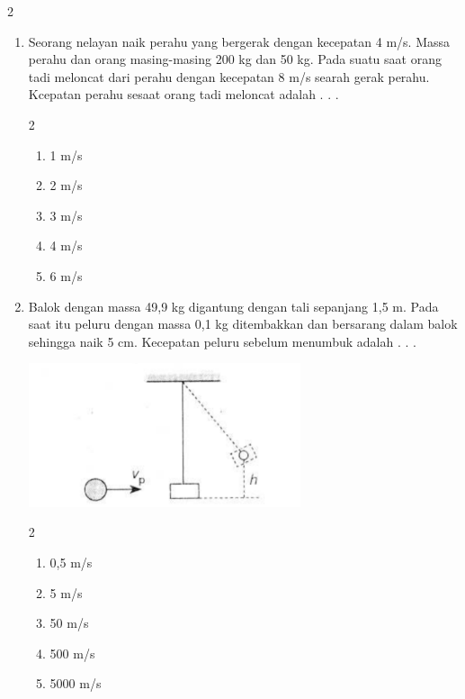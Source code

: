 \documentclass[11pt,a4paper]{extarticle}
\newcommand{\pilgani}[1]{                            \vspace{-0.3cm}\begin{multicols}{2}
 \begin{enumerate}[label=\Alph*., itemsep=0pt,topsep=0pt,leftmargin=*,align=Center]#1                     \end{enumerate}
 \phantom{ini cuma sapi, wedus, dan ayam}
 \end{multicols}}
\begin{document}
\begin{multicols*}{2}
\begin{enumerate}
\item Seorang nelayan naik perahu yang bergerak dengan kecepatan 4 m/s. Massa perahu dan orang masing-masing 200 kg dan 50 kg. Pada suatu saat orang tadi meloncat dari perahu dengan kecepatan 8 m/s searah gerak perahu. Kcepatan perahu sesaat orang tadi meloncat adalah . . .
\pilgani{
        \item 1 m/s
        \item 2 m/s
        \item 3 m/s
        \item 4 m/s
        \item 6 m/s
        }
\vspace{5cm}

\item Balok dengan massa 49,9 kg digantung dengan tali sepanjang 1,5 m. Pada saat itu peluru dengan massa 0,1 kg ditembakkan dan bersarang dalam balok sehingga naik 5 cm. Kecepatan peluru sebelum menumbuk adalah . . .

\includegraphics[width=8cm]{pic/mom3}

\pilgani{
        \item 0,5 m/s
        \item 5 m/s
        \item 50 m/s
        \item 500 m/s
        \item 5000 m/s
        }


\end{enumerate}



\end{multicols*}
\end{document}
